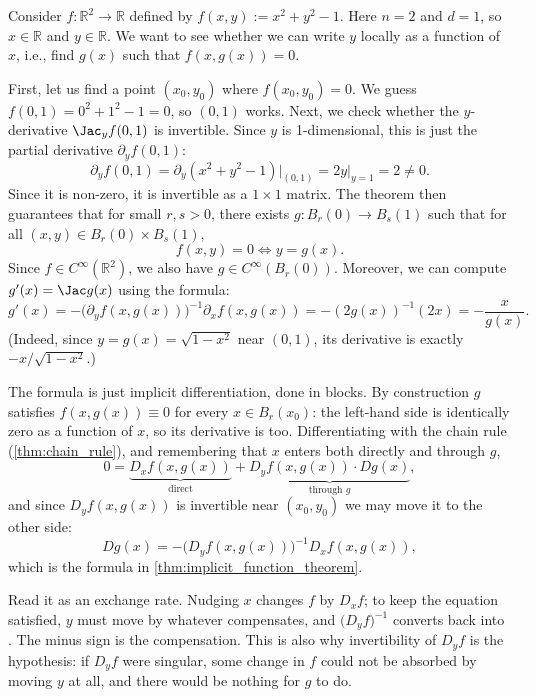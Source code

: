 \begin{example}
\label{ex:implicit_function_circle}
Consider $f : \mathbb{R}^2 \to \mathbb{R}$ defined by $f(x,y) := x^2 + y^2 - 1$.
Here $n=2$ and $d=1$, so $x \in \mathbb{R}$ and $y \in \mathbb{R}$. We want to see whether we can write $y$ locally as a function of $x$, i.e., find $g(x)$ such that $f(x,g(x)) = 0$.

First, let us find a point $(x_0,y_0)$ where $f(x_0,y_0) = 0$. We guess $f(0,1) = 0^2+1^2-1 = 0$, so $(0,1)$ works.
Next, we check whether the $y$-derivative $\Jac_y f(0,1)$ is invertible. Since $y$ is 1-dimensional, this is just the partial derivative $\partial_y f(0,1)$:
\[\partial_y f(0,1) = \partial_y(x^2+y^2-1)\big|_{(0,1)} = 2y\big|_{y=1} = 2 \neq 0.\]
Since it is non-zero, it is invertible as a $1\times 1$ matrix.
The theorem then guarantees that for small $r, s > 0$, there exists $g : B_r(0) \to B_s(1)$ such that for all $(x,y) \in B_r(0)\times B_s(1)$,
\[f(x,y) = 0 \iff y = g(x).\]
Since $f \in C^\infty(\mathbb{R}^2)$, we also have $g \in C^\infty(B_r(0))$.
Moreover, we can compute $g'(x) = \Jac g(x)$ using the formula:
\[g'(x) = - \big(\partial_y f(x,g(x))\big)^{-1} \partial_x f(x,g(x)) = - (2g(x))^{-1} (2x) = -\frac{x}{g(x)}.\]
(Indeed, since $y=g(x) = \sqrt{1-x^2}$ near $(0,1)$, its derivative is exactly $-x/\sqrt{1-x^2}$.)
\end{example}

\begin{remark}
The formula is just implicit differentiation, done in blocks. By construction $g$ satisfies
$f(x,g(x)) \equiv 0$ for every $x \in B_r(x_0)$: the left-hand side is identically zero as a
function of $x$, so its derivative is too. Differentiating with the chain rule
(\cref{thm:chain_rule}), and remembering that $x$ enters both directly and through $g$,
\[0 = \underbrace{D_xf(x,g(x))}_{\text{direct}} + \underbrace{D_yf(x,g(x))\cdot Dg(x)}_{\text{through } g},\]
and since $D_yf(x,g(x))$ is invertible near $(x_0,y_0)$ we may move it to the other side:
\[Dg(x) = -\big(D_yf(x,g(x))\big)^{-1} D_xf(x,g(x)),\]
which is the formula in \cref{thm:implicit_function_theorem}.

Read it as an exchange rate. Nudging $x$ changes $f$ by $D_xf$; to keep the equation satisfied,
$y$ must move by whatever compensates, and $\big(D_yf\big)^{-1}$ converts 
back into . The minus sign is the compensation. This is also why
invertibility of $D_yf$ is the hypothesis: if $D_yf$ were singular, some change in $f$ could not
be absorbed by moving $y$ at all, and there would be nothing for $g$ to do.
\end{remark}

